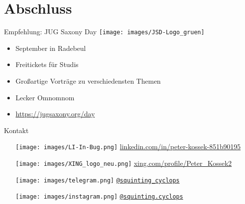 \section{Abschluss}

\begin{frame}{Empfehlung: JUG Saxony Day}
	\centering
	\texttt{[image: images/JSD-Logo\_gruen]}
	\vspace{2em}
	\begin{itemize}
		\item September in Radebeul
		\item Freitickets für Studis
		\item Großartige Vorträge zu verschiedensten Themen
		\item Lecker Omnomnom
		\item \url{https://jugsaxony.org/day}
	\end{itemize}
\end{frame}

\begin{frame}{Kontakt}
	\begin{itemize}
		\item[{\texttt{[image: images/LI-In-Bug.png]}}] \href{https://www.linkedin.com/in/peter-kossek-851b90195}{linkedin.com/in/peter-kossek-851b90195}
	
		\item[{\texttt{[image: images/XING\_logo\_neu.png]}}] \href{https://www.xing.com/profile/Peter_Kossek2}{xing.com/profile/Peter\_Kossek2}
		
		\item[{\texttt{[image: images/telegram.png]}}] \href{https://t.me/squinting_cyclops}{\texttt{@squinting\_cyclops}}
		
		\item[{\texttt{[image: images/instagram.png]}}] \href{https://www.instagram.com/squinting.cyclops}{\texttt{@squinting.cyclops}}
	\end{itemize}

\end{frame}